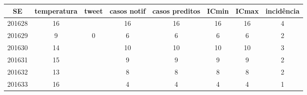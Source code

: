 \begin{tabular}{c|ccccccc}
  \hline
SE & temperatura & tweet & casos notif & casos preditos & ICmin & ICmax & incidência \\ 
  \hline
201628 & 16 &  & 16 & 16 & 16 & 16 & 4 \\ 
  201629 & 9 & 0 & 6 & 6 & 6 & 6 & 2 \\ 
  201630 & 14 &  & 10 & 10 & 10 & 10 & 3 \\ 
  201631 & 15 &  & 9 & 9 & 9 & 9 & 2 \\ 
  201632 & 13 &  & 8 & 8 & 8 & 8 & 2 \\ 
  201633 & 16 &  & 4 & 4 & 4 & 4 & 1 \\ 
   \hline
\end{tabular}
